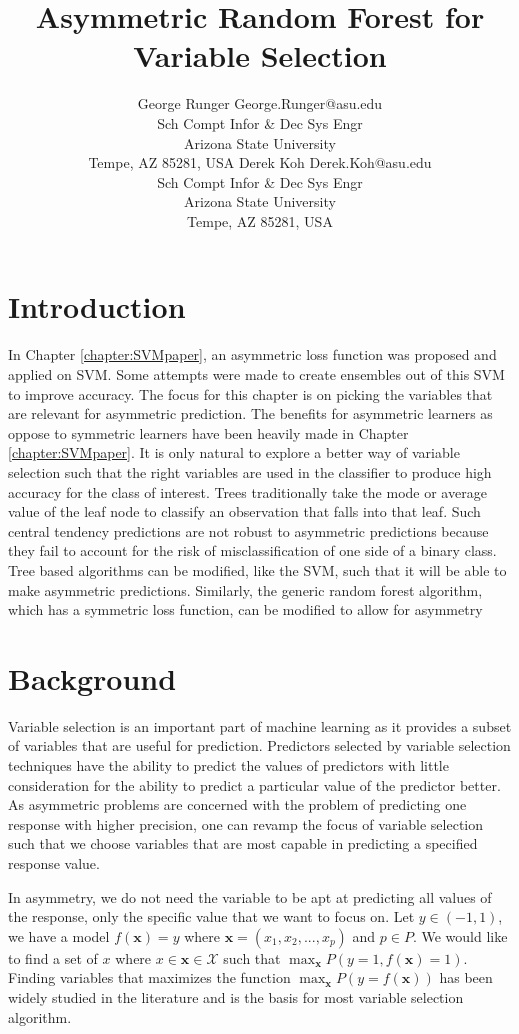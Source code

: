 \documentclass[twoside,11pt]{article}
\title{Asymmetric Random Forest for Variable Selection}
\author{\name George Runger \email George.Runger@asu.edu\\
       \addr Sch Compt Infor \& Dec Sys Engr\\
       Arizona State University\\
       Tempe, AZ 85281, USA
       \AND
       \name Derek Koh \email Derek.Koh@asu.edu \\
       \addr Sch Compt Infor \& Dec Sys Engr\\
       Arizona State University\\
       Tempe, AZ 85281, USA}
\begin{document}
\maketitle

\section{Introduction}
In Chapter \ref{chapter:SVMpaper}, an asymmetric loss function was proposed and applied on SVM. Some attempts were made to create ensembles out of this SVM to improve accuracy. The focus for this chapter is on picking the variables that are relevant for asymmetric prediction. The benefits for asymmetric learners as oppose to symmetric learners have been heavily made in Chapter \ref{chapter:SVMpaper}. It is only natural to explore a better way of variable selection such that the right variables are used in the classifier to produce high accuracy for the class of interest. Trees traditionally take the mode or average value of the leaf node to classify an observation that falls into that leaf. Such central tendency predictions are not robust to asymmetric predictions because they fail to account for the risk of misclassification of one side of a binary class. Tree based algorithms can be modified, like the SVM, such that it will be able to make asymmetric predictions. Similarly, the generic random forest algorithm, which has a symmetric loss function, can be modified to allow for asymmetry

\section{Background}
Variable selection is an important part of machine learning as it provides a subset of variables that are useful for prediction. Predictors selected by variable selection techniques have the ability to predict the values of predictors with little consideration for the ability to predict a particular value of the predictor better. As asymmetric problems are concerned with the problem of predicting one response with higher precision, one can revamp the focus of variable selection such that we choose variables that are most capable in predicting a specified response value.

In asymmetry, we do not need the variable to be apt at predicting all values of the response, only the specific value that we want to focus on. Let $y \in (-1,1)$, we have a model $f(\mathbf{x})=y$ where $\mathbf{x} = (x_1,x_2,...,x_p)$ and $p \in P$. We would like to find a set of $x$ where $x \in \mathbf{x} \in \mathcal{X}$ such that $\displaystyle\max_{\mathbf{x}}P(y=1,f(\mathbf{x})=1)$. Finding variables that maximizes the function $\displaystyle\max_{\mathbf{x}}P(y=f(\mathbf{x}))$ has been widely studied in the literature and is the basis for most variable selection algorithm. 
\end{document}
